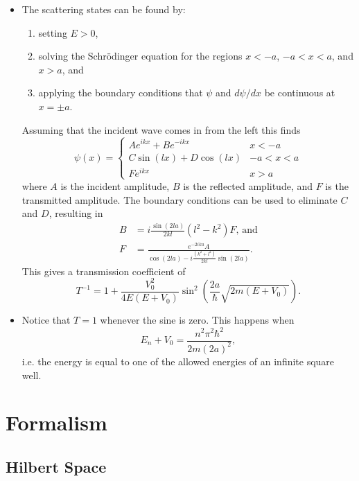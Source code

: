 \documentclass{article}
\begin{document}
\begin{itemize}
  \item The scattering states can be found by:

        \begin{enumerate}
          \item setting $E > 0$,

          \item solving the Schrödinger equation for the regions $x < -a$, $-a < x < a$, and $x > a$, and

          \item applying the boundary conditions that $\psi$ and $d \psi / d x$ be continuous at $x = \pm a$.
        \end{enumerate}

        Assuming that the incident wave comes in from the left this finds \[\psi(x) = \begin{cases}
            A e^{i k x} + B e^{-i k x}  & x < - a    \\
            C \sin (l x) + D \cos (l x) & -a < x < a \\
            F e^{i k x}                 & x > a
          \end{cases}\] where $A$ is the incident amplitude, $B$ is the reflected amplitude, and $F$ is the transmitted amplitude. The boundary conditions can be used to eliminate $C$ and $D$, resulting in \begin{align*}
          B & = i \frac{\sin (2 l a)}{2 k l} (l^2 - k^2) F \text{, and}                         \\
          F & = \frac{e^{-2 i k a} A}{\cos (2 l a) - i \frac{(k^2 + l^2)}{2 k l} \sin (2 l a)}.
        \end{align*} This gives a transmission coefficient of \[T^{-1} = 1 + \frac{V_0^2}{4 E (E + V_0)} \sin^2 \left( \frac{2 a}{\hbar} \sqrt{2 m (E + V_0)} \right).\]

  \item Notice that $T = 1$ whenever the sine is zero. This happens when \[E_n + V_0 = \frac{n^2 \pi^2 \hbar^2}{2 m (2 a)^2},\] i.e. the energy is equal to one of the allowed energies of an infinite square well.
\end{itemize}

\section{Formalism}

\subsection{Hilbert Space}
\end{document}
